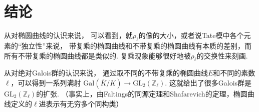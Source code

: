 \chapter{结论}

从对椭圆曲线的认识来说，
可以看到，就$\rho_{\ell}$的像的大小，或者说Tate模中各个元素的“独立性”来说，
带复乘的椭圆曲线和不带复乘的椭圆曲线有本质的差别，而所有不带复乘的椭圆曲线都是类似的.
复乘现象能够很好地被$\rho_{\ell}$的交换性来刻画.

从对绝对Galois群的认识来说，
通过取不同的不带复乘的椭圆曲线$E$和不同的素数$\ell$，可以得到一系列满射
$\mathrm{Gal}(\overline{K}/K) \to \mathrm{GL}_2(\mathbb{Z}_{\ell})$.
这就给出了很多Galois群是$\mathrm{GL}_2(\mathbb{Z}_{\ell})$的扩张.
（事实上，由Faltings的同源定理和Shafarevich的定理，椭圆曲线定义的$\ell$进表示有无穷多个同构类）



